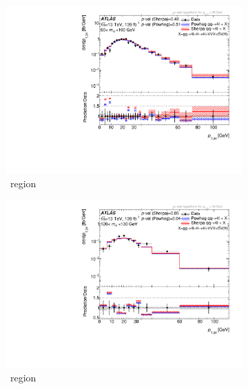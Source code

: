 \begin{figure}[H]
    \begin{subfigure}{.49\textwidth}\centering
      \includegraphics[width=.95\linewidth]{Figures/m4l/UnfoldedResults/linlog_Unfolded_Data_pt34_m4l60-100.pdf}\caption{\ZFourL \ region}\label{fig:sub-first}
    \end{subfigure}
    \begin{subfigure}{.49\textwidth}\centering
      \includegraphics[width=.95\linewidth]{Figures/m4l/UnfoldedResults/linlog_Unfolded_Data_pt34_m4l120-130.pdf} \caption{\HFourL \ region}\label{fig:sub-second}
    \end{subfigure}
    \begin{subfigure}{.49\textwidth}\centering

\end{subfigure}
\end{figure}
